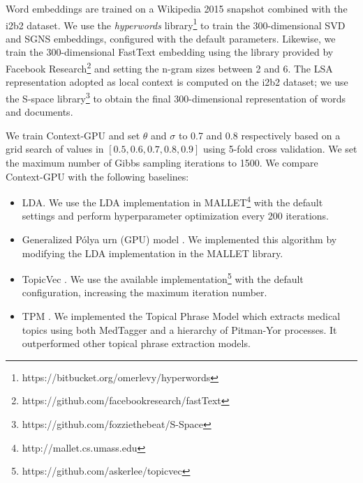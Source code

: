 \documentclass[letterpaper]{article}
\begin{document}
Word embeddings are trained on a Wikipedia 2015 snapshot combined with the i2b2 dataset. We use the \textit{hyperwords} library\footnote{https://bitbucket.org/omerlevy/hyperwords} \cite{Levy15} to train the 300-dimensional SVD and SGNS embeddings, configured with the default parameters. Likewise, we train the 300-dimensional FastText embedding using the library provided by Facebook Research\footnote{https://github.com/facebookresearch/fastText} and setting the n-gram sizes between 2 and 6.
The LSA representation adopted as local context is computed on the i2b2 dataset; we use the S-space library\footnote{https://github.com/fozziethebeat/S-Space} to obtain the final 300-dimensional representation of words and documents.

We train Context-GPU and set $\theta$ and $\sigma$ to 0.7 and 0.8 respectively based on a grid search of values in $[0.5, 0.6, 0.7, 0.8, 0.9]$ using 5-fold cross validation.  %
We set the maximum number of Gibbs sampling iterations to 1500. %
We compare Context-GPU with the following baselines:

\begin{itemize}
\item LDA. We use the LDA implementation in  MALLET\footnote{http://mallet.cs.umass.edu} with the default settings and perform hyperparameter optimization every 200 iterations.
\item Generalized P\'{o}lya urn (GPU) model \cite{Mimno11}. %
We implemented this algorithm by modifying the LDA implementation in the MALLET library.
\item TopicVec \cite{Li16}. %
We use the available implementation\footnote{https://github.com/askerlee/topicvec} with the default configuration, increasing the maximum iteration number.
\item TPM \cite{He16Med}. We implemented the Topical Phrase Model which extracts medical topics using both MedTagger and a hierarchy of Pitman-Yor processes. It outperformed other topical phrase extraction models. %
\end{itemize}
\end{document}
